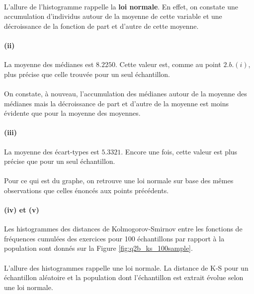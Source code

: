 \documentclass[a4paper,11pt]{article}
\begin{document}
\paragraph{} L'allure de l'histogramme rappelle la \textbf{loi normale}. En effet, on constate une accumulation d'individus autour de la moyenne de cette variable et une décroissance de la fonction de part et d'autre de cette moyenne.
\paragraph{(ii)} La moyenne des médianes est $\mathbf{8.2250}$. Cette valeur est, comme au point $2.b.(i)$, plus précise que celle trouvée pour un seul échantillon. 
\paragraph{}
On constate, à nouveau, l'accumulation des médianes autour de la moyenne des médianes mais la décroissance de part et d'autre de la moyenne est moins évidente que pour la moyenne des moyennes.  
\paragraph{(iii)} La moyenne des écart-types est $\mathbf{5.3321}$. Encore une fois, cette valeur est plus précise que pour un seul échantillon. 
\paragraph{}
Pour ce qui est du graphe, on retrouve une loi normale sur base des mêmes observations que celles énoncés aux points précédents.
\paragraph{(iv) et (v)} Les histogrammes des distances de Kolmogorov-Smirnov entre les fonctions de fréquences cumulées des exercices pour 100 échantillons par rapport à la population sont donnés sur la Figure \ref{fig:q2b_ks_100sample}. 
\paragraph{}
L'allure des histogrammes rappelle une loi normale. La distance de K-S pour un échantillon aléatoire et la population dont l'échantillon est extrait évolue selon une loi normale.
\end{document}
